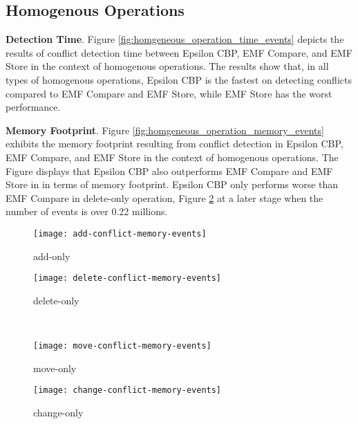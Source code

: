 \subsection{Homogenous Operations}
\label{sec:homogenous-operation_conflict}

\textbf{Detection Time}. Figure \ref{fig:homgeneous_operation_time_events} depicts the results of conflict detection time between Epsilon CBP, EMF Compare, and EMF Store in the context of homogenous operations. The results show that, in all types of homogenous operations, Epsilon CBP is the fastest on detecting conflicts compared to EMF Compare and EMF Store, while EMF Store has the worst performance. 

\textbf{Memory Footprint}. Figure \ref{fig:homgeneous_operation_memory_events} exhibits the memory footprint resulting from conflict detection in Epsilon CBP, EMF Compare, and EMF Store in the context of homogenous operations. The Figure displays that Epsilon CBP also outperforms EMF Compare and EMF Store in in terms of memory footprint. Epsilon CBP only performs worse than EMF Compare in delete-only operation, Figure \ref{fig:delete-conflict-memory-events} at a later stage when the number of events is over 0.22 millions.  

\begin{figure*}[ht]
  \centering
  \begin{subfigure}[t]{0.495\linewidth}
    \texttt{[image: add-conflict-memory-events]}
    \caption{add-only}
    \label{fig:add-conflict-memory-events}
  \end{subfigure}
  \hfill
  \begin{subfigure}[t]{0.495\linewidth}
    \texttt{[image: delete-conflict-memory-events]}
    \caption{delete-only}
    \label{fig:delete-conflict-memory-events}
  \end{subfigure}
  \\
  \begin{subfigure}[t]{0.495\linewidth}
    \texttt{[image: move-conflict-memory-events]}
    \caption{move-only}
    \label{fig:move-conflict-memory-events}
  \end{subfigure}
  \hfill
  \begin{subfigure}[t]{0.495\linewidth}
    \texttt{[image: change-conflict-memory-events]}
    \caption{change-only}
    \label{fig:change-conflict-memory-events}
  \end{subfigure}
  \caption{Conflict detection memory for homogeneous operations.}
  \label{fig:homgeneous_operation_memory_events}
\end{figure*}

